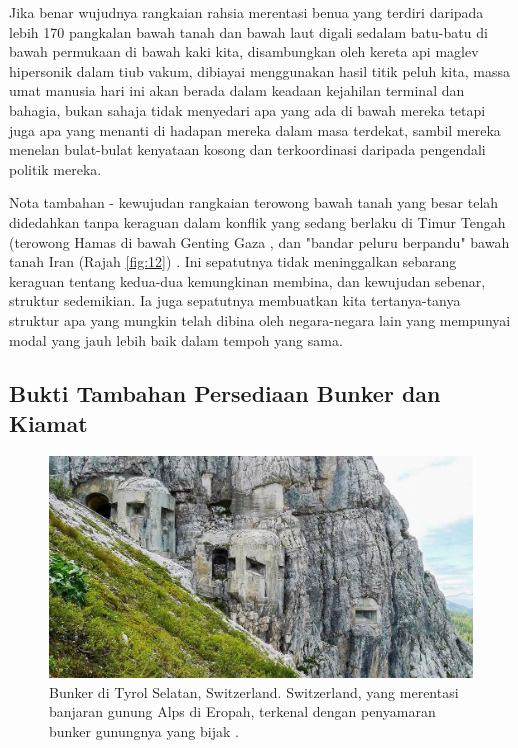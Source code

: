 \documentclass[10pt,twocolumn,letterpaper]{article}
\begin{document}
Jika benar wujudnya rangkaian rahsia merentasi benua yang terdiri daripada lebih 170 pangkalan bawah tanah dan bawah laut digali sedalam batu-batu di bawah permukaan di bawah kaki kita, disambungkan oleh kereta api maglev hipersonik dalam tiub vakum, dibiayai menggunakan hasil titik peluh kita, massa umat manusia hari ini akan berada dalam keadaan kejahilan terminal dan bahagia, bukan sahaja tidak menyedari apa yang ada di bawah mereka tetapi juga apa yang menanti di hadapan mereka dalam masa terdekat, sambil mereka menelan bulat-bulat kenyataan kosong dan terkoordinasi daripada pengendali politik mereka.

Nota tambahan - kewujudan rangkaian terowong bawah tanah yang besar telah didedahkan tanpa keraguan dalam konflik yang sedang berlaku di Timur Tengah (terowong Hamas di bawah Genting Gaza \cite{38}, dan "bandar peluru berpandu" bawah tanah Iran (Rajah \ref{fig:12}) \cite{39,40}. Ini sepatutnya tidak meninggalkan sebarang keraguan tentang kedua-dua kemungkinan membina, dan kewujudan sebenar, struktur sedemikian. Ia juga sepatutnya membuatkan kita tertanya-tanya struktur apa yang mungkin telah dibina oleh negara-negara lain yang mempunyai modal yang jauh lebih baik dalam tempoh yang sama.
\subsection{Bukti Tambahan Persediaan Bunker dan Kiamat}

\begin{figure}[t]
\begin{center}
   \includegraphics[width=1\linewidth]{tyrol.jpg}
\end{center}
   \caption{Bunker di Tyrol Selatan, Switzerland. Switzerland, yang merentasi banjaran gunung Alps di Eropah, terkenal dengan penyamaran bunker gunungnya yang bijak \cite{32}.}
\label{fig:7}
\label{fig:onecol}
\end{figure}
\end{document}
